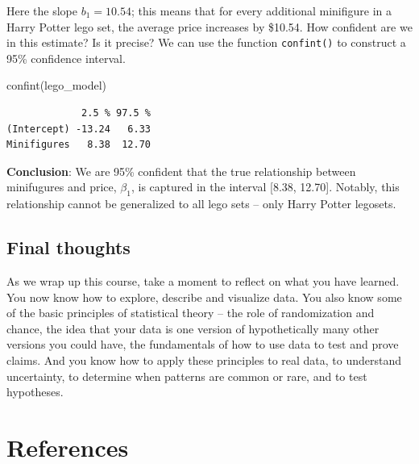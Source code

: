 \documentclass[
  letterpaper,
  DIV=11,
  numbers=noendperiod]{scrreprt}
\newenvironment{Shaded}{\begin{snugshade}}{\end{snugshade}}
\newcommand{\FunctionTok}[1]{\textcolor[rgb]{0.28,0.35,0.67}{#1}}
\newcommand{\NormalTok}[1]{\textcolor[rgb]{0.00,0.23,0.31}{#1}}
\theoremstyle{definition}
\theoremstyle{remark}
\begin{document}
Here the slope \(b_1 = 10.54\); this means that for every additional
minifigure in a Harry Potter lego set, the average price increases by
\$10.54. How confident are we in this estimate? Is it precise? We can
use the function \texttt{confint()} to construct a 95\% confidence
interval.

\begin{Shaded}
\begin{Highlighting}[]
\FunctionTok{confint}\NormalTok{(lego\_model)}
\end{Highlighting}
\end{Shaded}

\begin{verbatim}
             2.5 % 97.5 %
(Intercept) -13.24   6.33
Minifigures   8.38  12.70
\end{verbatim}

\textbf{Conclusion}: We are 95\% confident that the true relationship
between minifugures and price, \(\beta_1\), is captured in the interval
{[}8.38, 12.70{]}. Notably, this relationship cannot be generalized to
all lego sets -- only Harry Potter legosets.

\hypertarget{final-thoughts}{%
\section{Final thoughts}\label{final-thoughts}}

As we wrap up this course, take a moment to reflect on what you have
learned. You now know how to explore, describe and visualize data. You
also know some of the basic principles of statistical theory -- the role
of randomization and chance, the idea that your data is one version of
hypothetically many other versions you could have, the fundamentals of
how to use data to test and prove claims. And you know how to apply
these principles to real data, to understand uncertainty, to determine
when patterns are common or rare, and to test hypotheses.

\hypertarget{references}{%
\chapter*{References}\label{references}}

\end{document}
